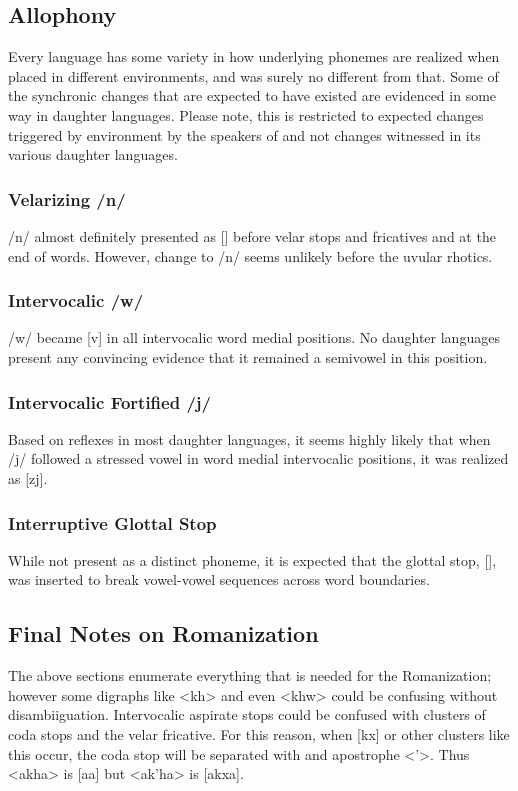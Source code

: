   \subsection{Allophony}
  Every language has some variety in how underlying phonemes are realized when placed in different environments, and \langname was surely no different from that. Some of the synchronic changes that are expected to have existed are evidenced in some way in daughter languages. Please note, this is restricted to expected changes triggered by environment by the speakers of \langname and not changes witnessed in its various daughter languages.\par
    \subsubsection{Velarizing /n/}
    /n/ almost definitely presented as [] before velar stops and fricatives and at the end of words. However, change to /n/ seems unlikely before the uvular rhotics.
    \subsubsection{Intervocalic /w/}
    /w/ became [v] in all intervocalic word medial positions. No daughter languages present any convincing evidence that it remained a semivowel in this position.
    \subsubsection{Intervocalic Fortified /j/}
    Based on reflexes in most daughter languages, it seems highly likely that when /j/ followed a stressed vowel in word medial intervocalic positions, it was realized as [zj].
    \subsubsection{Interruptive Glottal Stop}
    While not present as a distinct phoneme, it is expected that the glottal stop, [], was inserted to break vowel-vowel sequences across word boundaries.
  \subsection{Final Notes on Romanization}
  The above sections enumerate everything that is needed for the Romanization; however some digraphs like <kh> and even <khw> could be confusing without disambiiguation. Intervocalic aspirate stops could be confused with clusters of coda stops and the velar fricative. For this reason, when [kx] or other clusters like this occur, the coda stop will be separated with and apostrophe <'>. Thus <akha> is [a\taspk a] but <ak'ha> is [akxa].
